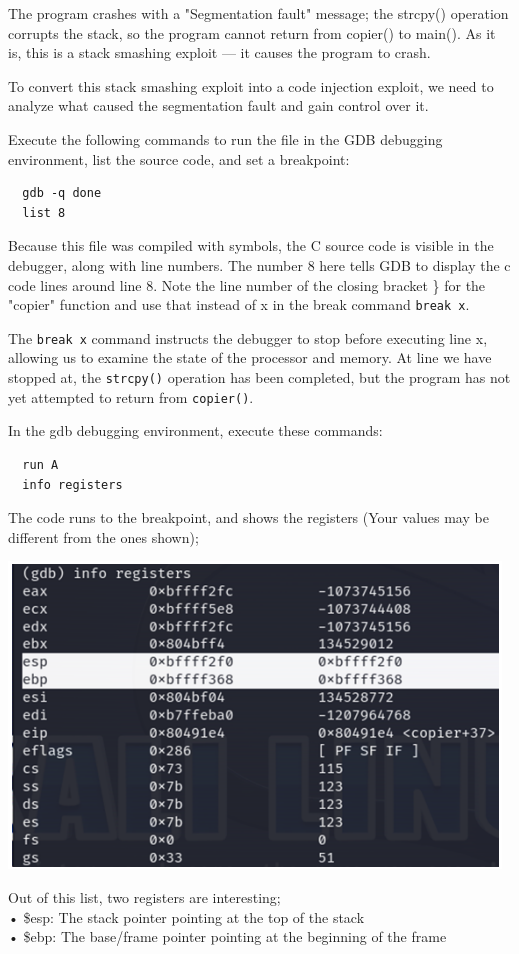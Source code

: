 \documentclass[]{project_plan}
\begin{document}
The program crashes with a "Segmentation fault" message;
the strcpy() operation corrupts the stack, so the program cannot return
from copier() to main(). As it is, this is a stack smashing exploit — it
causes the program to crash.

To convert this stack smashing exploit into a code injection
exploit, we need to analyze what caused the segmentation fault
and gain control over it.

Execute the following commands to run the file in the GDB debugging environment,
list the source code, and set a breakpoint:
\begin{lstlisting}
  gdb -q done
  list 8
\end{lstlisting}
Because this file was compiled with symbols, the C source code is visible
in the debugger, along with line numbers. The number 8 here tells
GDB to display the c code lines around line 8. Note the line number of
the closing bracket \} for the "copier" function and use that instead of x
in the break command \lstinline|break x|.

The \lstinline|break x| command instructs the debugger to stop before executing
line x, allowing us to examine the state of the processor and memory. At
line we have stopped at, the \lstinline|strcpy()| operation has been completed, but
the program has not yet attempted to return from \lstinline|copier()|.

In the gdb debugging environment, execute these commands:
\begin{lstlisting}
  run A
  info registers
\end{lstlisting}
The code runs to the breakpoint, and shows the registers (Your values may be
different from the ones shown);

\includegraphics[width=.5\linewidth]{lab4 breakpoint}

Out of this list, two registers are interesting;\\
• \$esp: The stack pointer pointing at the top of the stack\\
• \$ebp: The base/frame pointer pointing at the beginning of the frame
\end{document}
